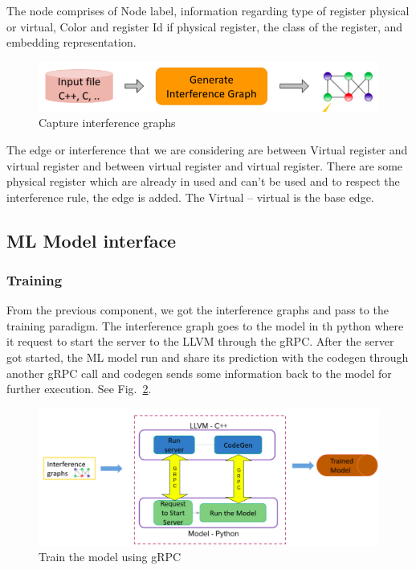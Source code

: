 The node comprises of Node label, information regarding type of register physical or virtual, Color and register Id if physical register, the class of the register, and embedding representation.

\begin{figure}[t]
    \centering
    \includegraphics[scale=0.4]{figures/chapter-5/mlra_cig.png}
    \caption{Capture interference graphs}
     \label{fig:mlra-cig}
\end{figure}

The edge or interference that we are considering are between Virtual register and virtual register and between virtual register and virtual register. There are some physical register which are already in used and can’t be used and to respect the interference rule, the edge is added. The Virtual -- virtual is the base edge.
\subsection{ML Model interface}

\subsubsection{Training}
From the previous component, we got the interference graphs and pass to the training paradigm. The interference graph goes to the model in th python where it request to start the server to the LLVM through the gRPC. After the server got started, the ML model run and share its prediction with the codegen through another gRPC call and codegen sends some information back to the model for further execution. See Fig.~\ref{fig:mlra-training}.

\begin{figure}[t]
    \centering
    \includegraphics[scale=0.4]{figures/chapter-5/mlra_training.png}
    \caption{Train the model using gRPC}
     \label{fig:mlra-training}
\end{figure}

